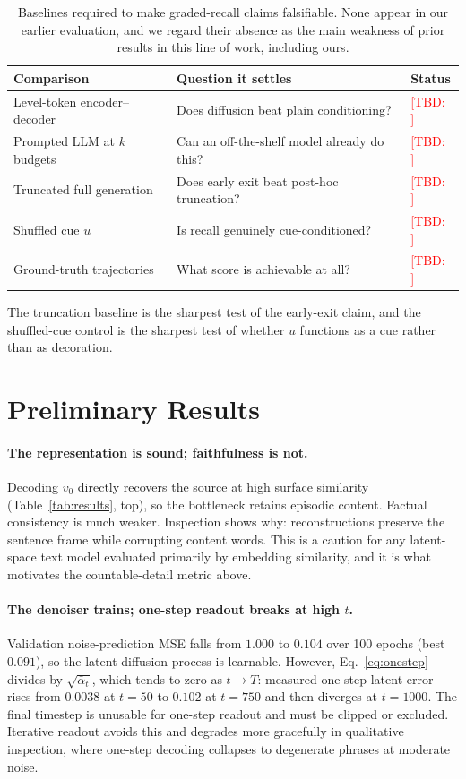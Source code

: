\documentclass{article}
\newcommand{\tbd}[1]{\textcolor{red}{[TBD: #1]}}
\begin{document}
\begin{table}[h]
  \centering
  \small
  \caption{Baselines required to make graded-recall claims falsifiable. None appear in our earlier evaluation, and we regard their absence as the main weakness of prior results in this line of work, including ours.}
  \label{tab:baselines}
  \begin{tabular}{lll}
    \toprule
    Comparison & Question it settles & Status \\
    \midrule
    Level-token encoder--decoder & Does diffusion beat plain conditioning? & \tbd{} \\
    Prompted LLM at $k$ budgets   & Can an off-the-shelf model already do this? & \tbd{} \\
    Truncated full generation     & Does early exit beat post-hoc truncation? & \tbd{} \\
    Shuffled cue $u$              & Is recall genuinely cue-conditioned? & \tbd{} \\
    Ground-truth trajectories     & What score is achievable at all? & \tbd{} \\
    \bottomrule
  \end{tabular}
\end{table}

The truncation baseline is the sharpest test of the early-exit claim, and the shuffled-cue control is the sharpest test of whether $u$ functions as a cue rather than as decoration.

\section{Preliminary Results}
\label{sec:results}

\paragraph{The representation is sound; faithfulness is not.}
Decoding $v_0$ directly recovers the source at high surface similarity (Table~\ref{tab:results}, top), so the bottleneck retains episodic content. Factual consistency is much weaker. Inspection shows why: reconstructions preserve the sentence frame while corrupting content words. This is a caution for any latent-space text model evaluated primarily by embedding similarity, and it is what motivates the countable-detail metric above.

\paragraph{The denoiser trains; one-step readout breaks at high $t$.}
Validation noise-prediction MSE falls from $1.000$ to $0.104$ over 100 epochs (best $0.091$), so the latent diffusion process is learnable. However, Eq.~\ref{eq:onestep} divides by $\sqrt{\bar\alpha_t}$, which tends to zero as $t \to T$: measured one-step latent error rises from $0.0038$ at $t{=}50$ to $0.102$ at $t{=}750$ and then diverges at $t{=}1000$. The final timestep is unusable for one-step readout and must be clipped or excluded. Iterative readout avoids this and degrades more gracefully in qualitative inspection, where one-step decoding collapses to degenerate phrases at moderate noise.
\end{document}
